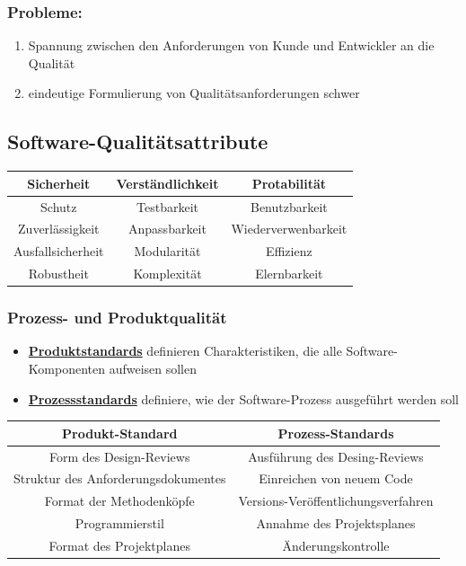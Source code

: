 \subsubsection{Probleme:}
\begin{enumerate}
    \item Spannung zwischen den Anforderungen von Kunde und Entwickler an die Qualität 
    \item eindeutige Formulierung von Qualitätsanforderungen schwer 
\end{enumerate}

\subsection{Software-Qualitätsattribute}
\begin{tabular}{|c|c|c|}
\hline
Sicherheit & Verständlichkeit & Protabilität \\\hline
Schutz & Testbarkeit & Benutzbarkeit \\\hline
Zuverlässigkeit & Anpassbarkeit & Wiederverwenbarkeit \\\hline
Ausfallsicherheit & Modularität & Effizienz \\\hline
Robustheit & Komplexität & Elernbarkeit \\\hline
\end{tabular}

\subsubsection{Prozess- und Produktqualität}
\begin{itemize}
    \item \textbf{\underline{Produktstandards}} definieren Charakteristiken, die alle Software-Komponenten aufweisen sollen 
    \item \textbf{\underline{Prozessstandards}} definiere, wie der Software-Prozess ausgeführt werden soll 
\end{itemize}
\begin{tabular}{|c|c|}
\hline
\textbf{Produkt-Standard} & \textbf{Prozess-Standards} \\\hline
Form des Design-Reviews & Ausführung des Desing-Reviews \\\hline
Struktur des Anforderungsdokumentes & Einreichen von neuem Code \\\hline 
Format der Methodenköpfe & Versions-Veröffentlichungsverfahren \\\hline
Programmierstil & Annahme des Projektsplanes \\\hline
Format des Projektplanes & Änderungskontrolle \\\hline
\end{tabular}
